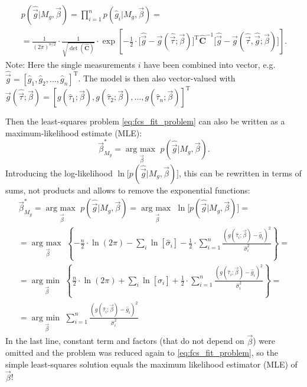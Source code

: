 \documentclass[a4paper,notitlepage]{article}
\DeclareMathOperator*{\argmin}{arg\:min\ }
\DeclareMathOperator*{\argmax}{arg\:max\ }
\newcommand{\mat}[1]{\mathrm{\mathbf{#1}}}
\begin{document}
\begin{multline}\label{eq:fcs_likelihood_covmatrix}
  p(\hat{\vec{g}}|M_g,\vec{\beta})=\prod\limits_{i=1}^np(\hat{g}_i|M_g,\vec{\beta})=\\
  =\frac{1}{(2\pi)^{n/2}}\cdot\frac{1}{\sqrt{\det(\hat{\mat{C}})}}\cdot\exp\left[-\frac{1}{2}\cdot\bigl[\hat{\vec{g}}-\vec{g}(\hat{\vec{\tau}}; \vec{\beta})\bigr]^\mathrm{T}\hat{\mat{C}}^{-1} \bigl[\hat{\vec{g}}-\vec{g}(\hat{\vec{\tau}}, \hat{\vec{g}}; \vec{\beta})\bigr]\right].
\end{multline}
Note: Here the single measurements $i$ have been combined into vector, e.g. $\hat{\vec{g}}=\left[\hat{g}_1, \hat{g}_2, ..., \hat{g}_n\right]^\mathrm{T}$. The model is then also vector-valued with $\vec{g}(\hat{\vec{\tau}}; \vec{\beta})=\left[g(\hat{\tau}_1;\vec{\beta}), g(\hat{\tau}_2;\vec{\beta}), ..., g(\hat{\tau}_n;\vec{\beta})\right]^\mathrm{T}$

Then the least-squares problem \eqref{eq:fcs_fit_problem} can also be written as a maximum-likelihood estimate (MLE):
\begin{equation}\label{eq:fcs_fit_problem_maxlikelihood}
  \vec{\beta}_{M_g}^\ast=\argmax\limits_{\vec{\beta}}p(\hat{\vec{g}}|M_g,\vec{\beta}).
\end{equation}
Introducing the log-likelihood $\ln \bigl[p(\hat{\vec{g}}|M_g,\vec{\beta})\bigr]$, this can be rewritten in terms of sums, not products and allows to remove the exponential functions:
\begin{multline*}
  \vec{\beta}_{M_g}^\ast=\argmax\limits_{\vec{\beta}}p(\hat{\vec{g}}|M_g,\vec{\beta})=\argmax\limits_{\vec{\beta}}\ln\bigl[p(\hat{\vec{g}}|M_g,\vec{\beta})\bigr]=\\
    =\argmax\limits_{\vec{\beta}}\left\{-\frac{n}{2}\cdot\ln(2\pi)-\sum\limits_i\ln\left[\hat{\sigma}_i\right]-\frac{1}{2}\cdot\sum\limits_{i=1}^n\frac{\left(g(\hat{\tau}_i;\vec{\beta})-\hat{g}_i\right)^2}{\hat{\sigma}_i^2}\right\}=\\
    =\argmin\limits_{\vec{\beta}}\left\{\frac{n}{2}\cdot\ln(2\pi)+\sum\limits_i\ln\left[\hat{\sigma}_i\right]+\frac{1}{2}\cdot\sum\limits_{i=1}^n\frac{\left(g(\hat{\tau}_i;\vec{\beta})-\hat{g}_i\right)^2}{\hat{\sigma}_i^2}\right\}=\\
    =\argmin\limits_{\vec{\beta}} \sum\limits_{i=1}^n\frac{\left(g(\hat{\tau}_i;\vec{\beta})-\hat{g}_i\right)^2}{\hat{\sigma}_i^2}
\end{multline*}
In the last line, constant term and factors (that do not depend on $\vec{\beta}$) were omitted and the problem was reduced again to \eqref{eq:fcs_fit_problem}, so the simple least-squares solution equals the maximum likelihood estimator (MLE) of $\vec{\beta}$!
\end{document}
